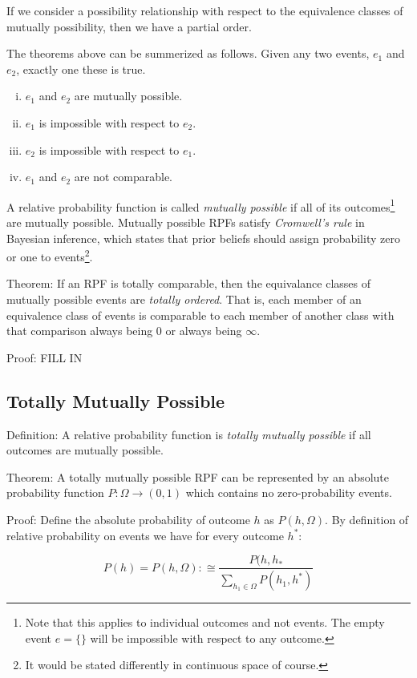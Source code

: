 \documentclass[twoside]{article}
\begin{document}
If we consider a possibility relationship with respect to the equivalence classes of mutually possibility, then we have a partial order.

The theorems above can be summerized as follows. Given any two events, \(e_1\) and \(e_2\), exactly one these is true.
\begin{enumerate}[(i)]
  \item \(e_1\) and \(e_2\) are mutually possible.
  \item \(e_1\) is impossible with respect to \(e_2\).
  \item \(e_2\) is impossible with respect to \(e_1\).
  \item \(e_1\) and \(e_2\) are not comparable.
\end{enumerate}

A relative probability function is called \textit{mutually possible} if all of its outcomes\footnote{Note that this applies to individual outcomes and not events. The empty event \(e = \{\}\) will be impossible with respect to any outcome.} are mutually possible. Mutually possible RPFs satisfy \textit{Cromwell's rule} in Bayesian inference, which states that prior beliefs should assign probability zero or one to events\footnote{It would be stated differently in continuous space of course.}.

Theorem: If an RPF is totally comparable, then the equivalance classes of mutually possible events are \textit{totally ordered}. That is, each member of an equivalence class of events is comparable to each member of another class with that comparison always being 0 or always being \(\infty\).

Proof: FILL IN

\subsection{Totally Mutually Possible}

Definition: A relative probability function is \textit{totally mutually possible} if all outcomes are mutually possible.

Theorem: A totally mutually possible RPF can be represented by an absolute probability function \(P: \Omega \rightarrow (0, 1)\) which contains no zero-probability events.

Proof: Define the absolute probability of outcome \(h\) as \(P(h, \Omega)\). By definition of relative probability on events we have for every outcome \(h^*\):

\[P(h)=P(h, \Omega):\cong \frac{P(h, h_*}{\sum_{h_1 \in \Omega} P(h_1, h^*)}\]
\end{document}
